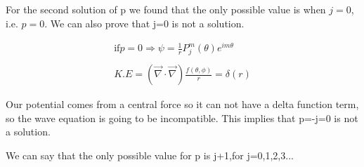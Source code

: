 For the second solution of p we found that the only possible value is when $j=0$, i.e. $p=0$. We can also prove that j=0 is not a solution.

\begin{equation}
  \begin{array}{c}
    \text{if} p=0 \Rightarrow \psi = \frac{1}{r}P_j^m(\theta)e^{im\theta}
    \\

    \\
    K.E = \left(\vec{\nabla}\cdot\vec{\nabla}\right) \frac{f(\theta,\phi)}{r} = \delta(r)
  \end{array}
\end{equation}

Our potential comes from a central force so it can not have a delta function term, so the wave equation is going to be incompatible. This implies that p=-j=0 is not a solution.

We can say that the only possible value for p is j+1,for j=0,1,2,3...
